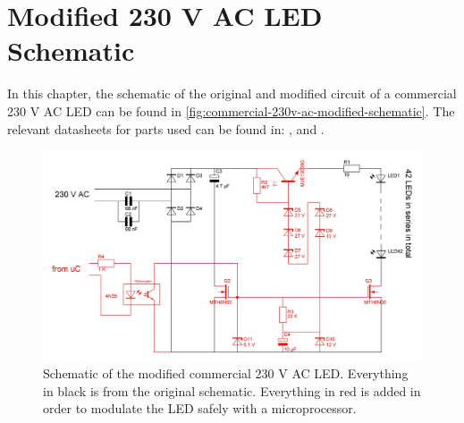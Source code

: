
\chapter{Modified 230 V AC LED Schematic}
\label{app:commercial-230v-ac-modified-schematic}

In this chapter, the schematic of the original and modified circuit of a commercial 230 V AC LED can be found in \autoref{fig:commercial-230v-ac-modified-schematic}.
The relevant datasheets for parts used can be found in: \cite{4n35-optocoupler-datasheet}, \cite{mth6n60-n-power-fet-datasheet} and \cite{mje13009g-npn-power-transistor-datasheet}.




\begin{figure}[htb]
	\includegraphics[angle=90,width=\textwidth,height=.9\textheight,keepaspectratio]{chapters/appendix/commercial-230v-ac-modified-schematic/commercial-230v-ac-modified-schematic.jpg}
	\caption{Schematic of the modified commercial 230 V AC LED. Everything in black is from the original schematic. Everything in red is added in order to modulate the LED safely with a microprocessor.}
	\label{fig:commercial-230v-ac-modified-schematic}
\end{figure}
